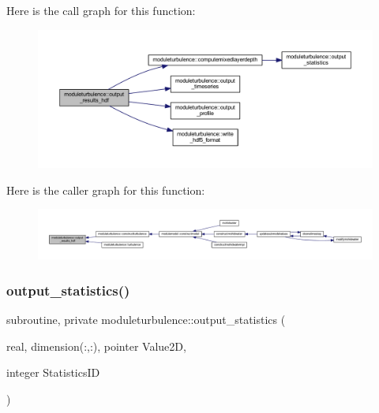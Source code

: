Here is the call graph for this function\+:\nopagebreak
\begin{figure}[H]
\begin{center}
\leavevmode
\includegraphics[width=350pt]{namespacemoduleturbulence_a3366379c368e20e48c460dff1f7585d8_cgraph}
\end{center}
\end{figure}
Here is the caller graph for this function\+:\nopagebreak
\begin{figure}[H]
\begin{center}
\leavevmode
\includegraphics[width=350pt]{namespacemoduleturbulence_a3366379c368e20e48c460dff1f7585d8_icgraph}
\end{center}
\end{figure}
\mbox{\label{namespacemoduleturbulence_a217345ed46e74ae2c1880a07108c9487}} 
\subsubsection{\texorpdfstring{output\+\_\+statistics()}{output\_statistics()}}
{\footnotesize\ttfamily subroutine, private moduleturbulence\+::output\+\_\+statistics (\begin{DoxyParamCaption}\item[{real, dimension(\+:,\+:), pointer}]{Value2D,  }\item[{integer}]{Statistics\+ID }\end{DoxyParamCaption})\hspace{0.3cm}{\ttfamily [private]}}

